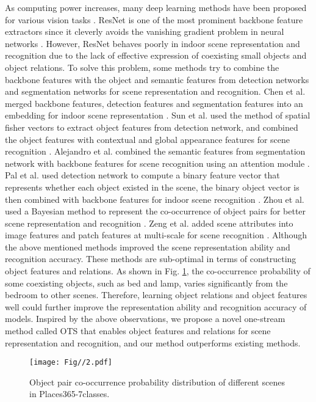 \documentclass[letterpaper, 10 pt, conference]{ieeeconf}  %
\begin{document}
As computing power increases, many deep learning methods have been proposed for various vision tasks \cite{Lei2020,He2017mask,Hristov2020,Zhang2018,Herranz2016}. ResNet is one of the most prominent backbone feature extractors since it cleverly avoids the vanishing gradient problem in neural networks \cite{He2016}. However, ResNet behaves poorly in indoor scene representation and recognition due to the lack of effective expression of coexisting small objects and object relations. To solve this problem, some methods try to combine the backbone features with the object and semantic features from detection networks and segmentation networks for scene representation and recognition. Chen et al. merged backbone features, detection features and segmentation features into an embedding for indoor scene representation \cite{Chen2018}. Sun et al. used the method of spatial fisher vectors to extract object features from detection network, and combined the object features with contextual and global appearance features for scene recognition \cite{sun2018fusing}. Alejandro et al. combined the semantic features from segmentation network with backbone features for scene recognition using an attention module \cite{lopez2020semantic}. Pal et al. used detection network to compute a binary feature vector that represents whether each object existed in the scene, the binary object vector is then combined with backbone features for indoor scene recognition \cite{pal2019deduce}. Zhou et al. used a Bayesian method to represent the co-occurrence of object pairs for better scene representation and recognition \cite{Zhou21borm}. Zeng et al. added scene attributes into image features and patch features at multi-scale for scene recognition \cite{zeng2019}. Although the above mentioned methods improved the scene representation ability and recognition accuracy. These methods are sub-optimal in terms of constructing object features and relations. As shown in Fig. \ref{img2}, the co-occurrence probability of some coexisting objects, such as bed and lamp, varies significantly from the bedroom to other scenes. Therefore, learning object relations and object features well could further improve the representation ability and recognition accuracy of models. Inspired by the above observations, we propose a novel one-stream method called OTS that enables object features and relations for scene representation and recognition, and our method outperforms existing methods.

\begin{figure}[]
        \centering
        \texttt{[image: Fig//2.pdf]}
        \vspace{-2mm}
        \caption{Object pair co-occurrence probability distribution of different scenes in Places365-7classes.}
        \vspace{-5mm}
        \label{img2}
\end{figure}
\end{document}
